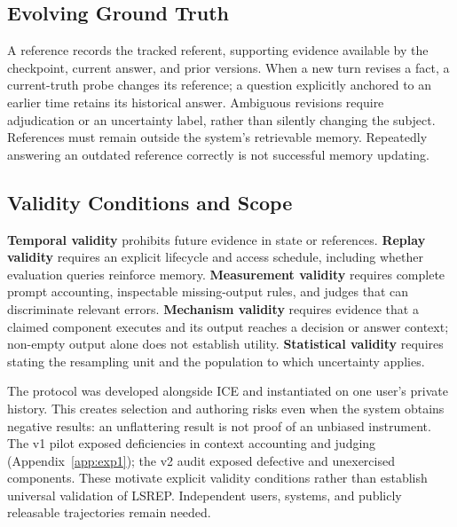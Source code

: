 \documentclass[11pt,a4paper]{article}
\begin{document}
\subsection{Evolving Ground Truth}
A reference records the tracked referent, supporting evidence available by the checkpoint, current answer, and prior versions. When a new turn revises a fact, a current-truth probe changes its reference; a question explicitly anchored to an earlier time retains its historical answer. Ambiguous revisions require adjudication or an uncertainty label, rather than silently changing the subject. References must remain outside the system's retrievable memory. Repeatedly answering an outdated reference correctly is not successful memory updating.

\subsection{Validity Conditions and Scope}
\label{sec:lsrep-standing}
\textbf{Temporal validity} prohibits future evidence in state or references. \textbf{Replay validity} requires an explicit lifecycle and access schedule, including whether evaluation queries reinforce memory. \textbf{Measurement validity} requires complete prompt accounting, inspectable missing-output rules, and judges that can discriminate relevant errors. \textbf{Mechanism validity} requires evidence that a claimed component executes and its output reaches a decision or answer context; non-empty output alone does not establish utility. \textbf{Statistical validity} requires stating the resampling unit and the population to which uncertainty applies.

The protocol was developed alongside ICE and instantiated on one user's private history. This creates selection and authoring risks even when the system obtains negative results: an unflattering result is not proof of an unbiased instrument. The v1 pilot exposed deficiencies in context accounting and judging (Appendix~\ref{app:exp1}); the v2 audit exposed defective and unexercised components. These motivate explicit validity conditions rather than establish universal validation of LSREP. Independent users, systems, and publicly releasable trajectories remain needed.
\end{document}
